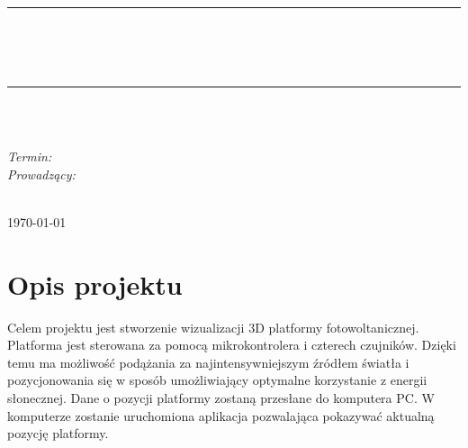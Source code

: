 \documentclass[10pt, a4paper]{article}
\begin{document}
\def\tablename{Tabela}	%

\begin{titlepage}
	\begin{center}
		\textsc{\LARGE \formakursu}\\[1cm]		
		\textsc{\Large \kurs}\\[0.5cm]		
		\rule{\textwidth}{0.08cm}\\[0.4cm]
		{\huge \bfseries \doctype}\\[1cm]
		{\huge \bfseries \projectname}\\[0.5cm]
		\rule{\textwidth}{0.08cm}\\[1cm]
		
		\begin{flushright} \large
		\osobaA\\[0.4cm]
		
		\emph{Termin: }\termin\\[0.4cm]

		\emph{Prowadzący:} \\
		\prowadzacy \\
		
		\end{flushright}
		
		\vfill
		
		{\large \today}
	\end{center}	
\end{titlepage}

\newpage
\tableofcontents
\newpage

\section{Opis projektu}
\label{sec:OpisProjektu}

Celem projektu jest stworzenie wizualizacji 3D platformy fotowoltanicznej. Platforma jest sterowana za pomocą mikrokontrolera i czterech czujników. Dzięki temu ma możliwość podążania za najintensywniejszym źródłem światła i pozycjonowania się w sposób umożliwiający optymalne korzystanie z energii słonecznej. Dane o pozycji platformy zostaną przesłane do komputera PC. W komputerze zostanie uruchomiona aplikacja pozwalająca pokazywać aktualną pozycję platformy.
\newline
\newline
\end{document}
